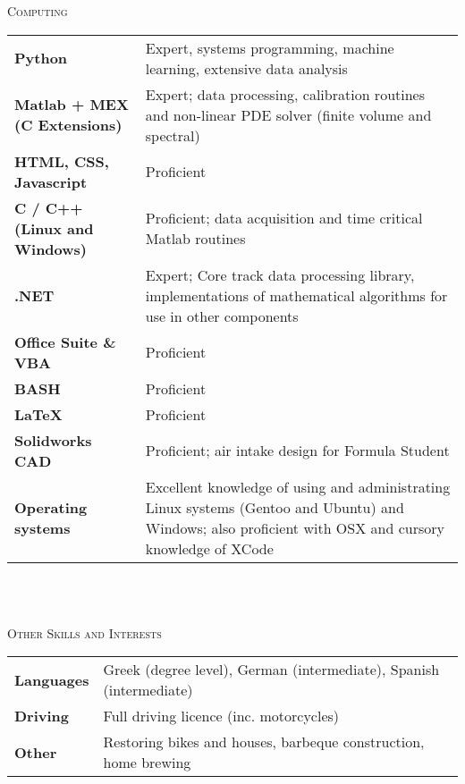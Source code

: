 \documentclass[a4paper,10pt]{article}
\newcommand{\lineunder}{\vspace*{0.2cm} \\ \hspace*{-20pt} \hrulefill \\ \vspace{-0.9cm}}
\newcommand{\header}[1]{{\hspace*{-17pt}\vspace*{6pt} \large{\textsc{#1}}}}
\begin{document}
\header{Computing}

\begin{tabular}{p{2.8in}p{3.3in}}
\textbf{Python} & Expert, systems programming, machine learning, extensive data analysis \\
\textbf{Matlab + MEX (C Extensions)} & Expert; data processing, calibration routines and non-linear PDE solver (finite volume and spectral)\\
\textbf{HTML, CSS, Javascript} & Proficient\\
\textbf{C / C++ (Linux and Windows)}     & Proficient; data acquisition and time critical Matlab routines\\
\textbf{.NET} & Expert; Core track data processing library, implementations of mathematical algorithms for use in other components\\
\textbf{Office Suite \& VBA} & Proficient\\
\textbf{BASH}   & Proficient\\
\textbf{\LaTeX} & Proficient\\
\textbf{Solidworks CAD} & Proficient; air intake design for Formula Student \\
\textbf{Operating systems} & Excellent knowledge of using and administrating Linux systems (Gentoo and Ubuntu) and  Windows; also proficient with OSX and cursory knowledge of XCode \\
\end{tabular}
\newline
\lineunder

\header{Other Skills and Interests}

\begin{tabular}{p{0.8in}p{5.3in}}
\textbf{Languages} & Greek (degree level), German (intermediate), Spanish (intermediate)\\
\textbf{Driving} & Full driving licence (inc. motorcycles) \\
\textbf{Other} & Restoring bikes and houses, barbeque construction, home brewing\\
\end{tabular}
\end{document}
